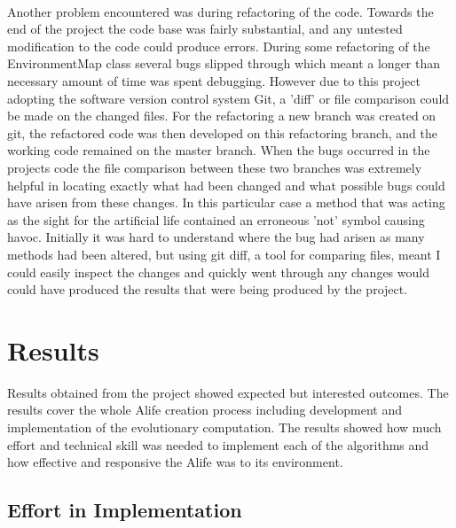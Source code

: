 \documentclass[12pt]{article}
\begin{document}
\paragraph{}
Another problem encountered was during refactoring of the code. Towards the end of the project the code base was fairly substantial, and any
untested modification to the code could produce errors. During some refactoring of the EnvironmentMap class several bugs slipped through
which meant a longer than necessary amount of time was spent debugging. However due to this project adopting the software version control system
Git, a 'diff' or file comparison could be made on the changed files. For the refactoring a new branch was created on git, the refactored code
was then developed on this refactoring branch, and the working code remained on the master branch. When the bugs occurred in the
projects code the file comparison between these two branches was extremely helpful in locating exactly what had been changed and what
possible bugs could have arisen from these changes. In this particular case a method that was acting as the sight for the artificial life
contained an erroneous 'not' symbol causing havoc. Initially it was hard to understand where the bug had arisen as many methods had been
altered, but using git diff, a tool for comparing files, meant I could easily inspect the changes and quickly went through any changes would could have produced the
results that were being produced by the project.

\section{Results}

Results obtained from the project showed expected but interested outcomes. The results cover the whole Alife creation process including
development and implementation of the evolutionary computation. The results showed how much effort and technical skill was needed to
implement each of the algorithms and how effective and responsive the Alife was to its environment.

\subsection{Effort in Implementation}
\end{document}
